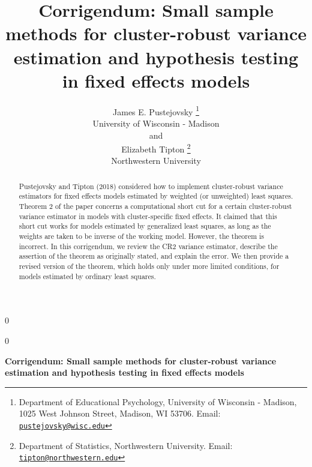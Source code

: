 \documentclass[12pt]{article}
\newcommand{\blind}{0}
\begin{document}
\def\spacingset#1{\renewcommand{\baselinestretch}%
{#1}\small\normalsize} \spacingset{1}



\blind
{
  \title{\bf Corrigendum: Small sample methods for cluster-robust
variance estimation and hypothesis testing in fixed effects models}

  \author{
        James E. Pustejovsky \thanks{Department of Educational
Psychology, University of Wisconsin - Madison, 1025 West Johnson Street,
Madison, WI 53706. Email:
\href{mailto:pustejovsky@wisc.edu}{\nolinkurl{pustejovsky@wisc.edu}}} \\
    University of Wisconsin - Madison\\
     and \\     Elizabeth Tipton \thanks{Department of Statistics,
Northwestern University. Email:
\href{mailto:tipton@northwestern.edu}{\nolinkurl{tipton@northwestern.edu}}} \\
    Northwestern University\\
      }
  \maketitle
} \fi

\blind
{
  \bigskip
  \bigskip
  \bigskip
  \begin{center}
    {\LARGE\bf Corrigendum: Small sample methods for cluster-robust
variance estimation and hypothesis testing in fixed effects models}
  \end{center}
  \medskip
} \fi

\bigskip
\begin{abstract}
Pustejovsky and Tipton (2018) considered how to implement cluster-robust
variance estimators for fixed effects models estimated by weighted (or
unweighted) least squares. Theorem 2 of the paper concerns a
computational short cut for a certain cluster-robust variance estimator
in models with cluster-specific fixed effects. It claimed that this
short cut works for models estimated by generalized least squares, as
long as the weights are taken to be inverse of the working model.
However, the theorem is incorrect. In this corrigendum, we review the
CR2 variance estimator, describe the assertion of the theorem as
originally stated, and explain the error. We then provide a revised
version of the theorem, which holds only under more limited conditions,
for models estimated by ordinary least squares.
\end{abstract}
\end{document}
